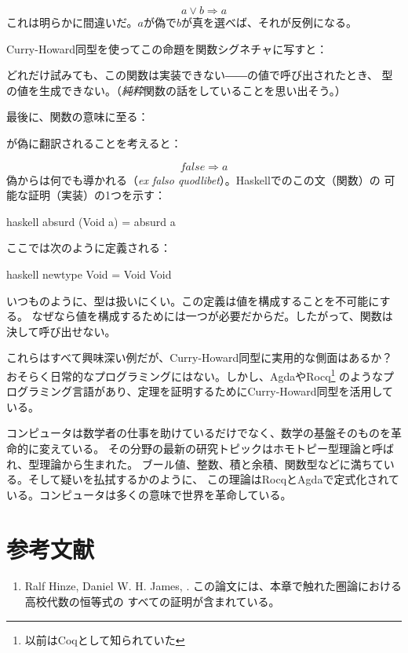 \[a \vee b \Rightarrow a\]
これは明らかに間違いだ。$a$が偽で$b$が真を選べば、それが反例になる。

Curry-Howard同型を使ってこの命題を関数シグネチャに写すと：

どれだけ試みても、この関数は実装できない――の値で呼び出されたとき、
型の値を生成できない。（\emph{純粋}関数の話をしていることを思い出そう。）

最後に、関数の意味に至る：

が偽に翻訳されることを考えると：

\[\mathit{false} \Rightarrow a\]
偽からは何でも導かれる（\emph{ex falso quodlibet}）。Haskellでのこの文（関数）の
可能な証明（実装）の1つを示す：

\begin{snip}{haskell}
absurd (Void a) = absurd a
\end{snip}
ここでは次のように定義される：

\begin{snip}{haskell}
newtype Void = Void Void
\end{snip}
いつものように、型は扱いにくい。この定義は値を構成することを不可能にする。
なぜなら値を構成するためには一つが必要だからだ。したがって、関数は
決して呼び出せない。

これらはすべて興味深い例だが、Curry-Howard同型に実用的な側面はあるか？
おそらく日常的なプログラミングにはない。しかし、AgdaやRocq\footnote{以前はCoqとして知られていた}
のようなプログラミング言語があり、定理を証明するためにCurry-Howard同型を活用している。

コンピュータは数学者の仕事を助けているだけでなく、数学の基盤そのものを革命的に変えている。
その分野の最新の研究トピックはホモトピー型理論と呼ばれ、型理論から生まれた。
ブール値、整数、積と余積、関数型などに満ちている。そして疑いを払拭するかのように、
この理論はRocqとAgdaで定式化されている。コンピュータは多くの意味で世界を革命している。

\section{参考文献}

\begin{enumerate}
  \tightlist
  \item
        Ralf Hinze, Daniel W. H. James,
        . この論文には、本章で触れた圏論における高校代数の恒等式の
        すべての証明が含まれている。
\end{enumerate}
